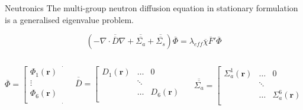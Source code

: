 \documentclass{beamer}
\renewcommand{\vec}[1]{\ensuremath{\overline{#1}}}
\newcommand{\mtx}[1]{\ensuremath{\overline{\overline{#1}}}}
\begin{document}
\begin{frame}{Neutronics}
    The multi-group neutron diffusion equation in stationary formulation is a generalised eigenvalue problem. 
    \begin{block}{}
        \[\left ( - \nabla \cdot \mtx{D} \nabla + \mtx{\Sigma_a} + \mtx{\Sigma_s} \right ) \vec{\Phi} = \lambda_{eff} \vec{\chi} \vec{F}' \vec{\Phi}\]
    \end{block}
    \small
    \bigskip
    \begin{columns}
        \begin{column}{0.2\textwidth}
            \[
                \vec{\Phi} = 
                            \begin{bmatrix}
                                \Phi_1 (\mathbf{r}) \\
                                \vdots \\
                                \Phi_6 (\mathbf{r}) \\
                            \end{bmatrix}
            \]
        \end{column}
        \begin{column}{0.4\textwidth} 
            \[
                \mtx{D} = 
                            \begin{bmatrix}
                                D_1 (\mathbf{r}) & \dots & 0 \\
                                & \ddots & \\
                                & \dots & D_6 (\mathbf{r}) \\
                            \end{bmatrix}
            \]
        \end{column}
        \begin{column}{0.4\textwidth} 
                \[
                \mtx{\Sigma_a} = 
                            \begin{bmatrix}
                                \Sigma_a^1 (\mathbf{r}) & \dots & 0 \\
                                & \ddots & \\
                                & \dots & \Sigma_a^6 (\mathbf{r}) \\
                            \end{bmatrix}
            \]
        \end{column}
    \end{columns}
    \begin{columns}

\end{columns}
\end{frame}
\end{document}
